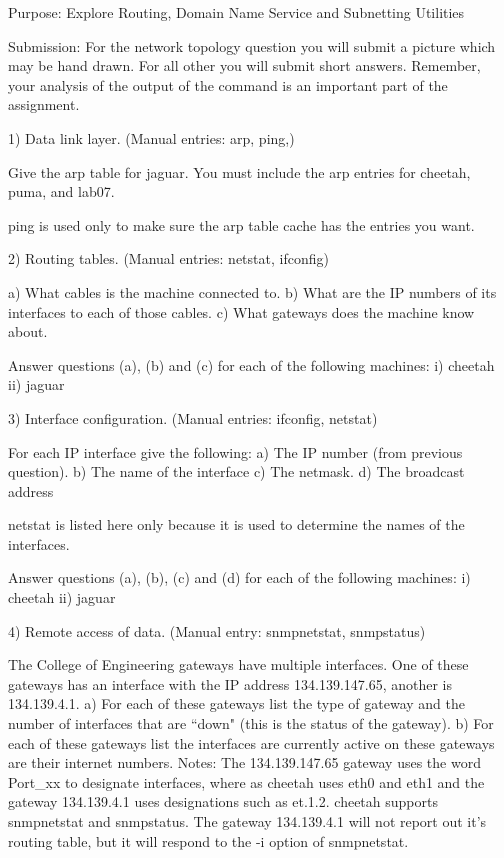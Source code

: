 

\nopagenumbers
{}
\parindent 0pt


Purpose: Explore Routing, Domain Name Service and Subnetting Utilities

Submission: 
For the network topology question you will submit a picture which may be hand 
drawn. 
For all other you will submit short answers.
Remember, your analysis of the output of the command is an important part
of the assignment.

1)
Data link layer.
(Manual entries: arp, ping,)

Give the arp table for jaguar.
You must include the arp entries for cheetah, puma, and lab07.

ping is used only to make sure the arp table cache has the entries you want.

\vfill
2) Routing tables. (Manual entries: netstat, ifconfig)

a) What cables is the machine connected to.
b) What are the IP numbers of its interfaces to each of those cables.
c) What gateways does the machine know about.

Answer questions (a), (b) and (c) for each of the following machines:
\hfil\break
i) cheetah
\hskip1in
ii) jaguar
\hskip1in

\vfill
3) Interface configuration. (Manual entries: ifconfig, netstat)

For each IP interface give the following:
a) The IP number (from previous question).
b) The name of the interface
c) The netmask.
d) The broadcast address

netstat is listed here only because it is used
to determine the names of the interfaces.

Answer questions (a), (b), (c) and (d) for each of the following machines:
\hfil\break
i) cheetah
\hskip1in
ii) jaguar
\hfil\break

\vfill
4) Remote access of data.
(Manual entry: snmpnetstat, snmpstatus)

The College of Engineering gateways have multiple interfaces.
One of these gateways has an interface with the IP address 134.139.147.65,
another is 134.139.4.1.
a) For each of these gateways list the type of gateway and the
number of interfaces that are ``down" (this is the status of
the gateway).
b) For each of these gateways list
the interfaces are currently active on these gateways
are their internet numbers.
Notes: The 134.139.147.65 gateway uses the word Port\_xx to designate 
interfaces,
where as cheetah uses eth0 and eth1 and the
gateway 134.139.4.1 uses designations such as et.1.2.
{\ltt{}cheetah} supports snmpnetstat and snmpstatus.
The gateway 134.139.4.1 will not report out it's routing table,
but it will respond to the {\ltt{}-i} option of {\ltt{}snmpnetstat}.

